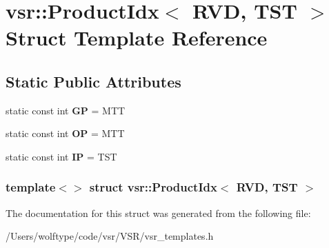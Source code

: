 \hypertarget{structvsr_1_1_product_idx_3_01_r_v_d_00_01_t_s_t_01_4}{\section{vsr\-:\-:Product\-Idx$<$ R\-V\-D, T\-S\-T $>$ Struct Template Reference}
\label{structvsr_1_1_product_idx_3_01_r_v_d_00_01_t_s_t_01_4}
}
\subsection*{Static Public Attributes}
\begin{DoxyCompactItemize}
\item 
\hypertarget{structvsr_1_1_product_idx_3_01_r_v_d_00_01_t_s_t_01_4_a3efa4a178ffda41733f9edd41c249d44}{static const int {\bfseries G\-P} = M\-T\-T}\label{structvsr_1_1_product_idx_3_01_r_v_d_00_01_t_s_t_01_4_a3efa4a178ffda41733f9edd41c249d44}

\item 
\hypertarget{structvsr_1_1_product_idx_3_01_r_v_d_00_01_t_s_t_01_4_a1bb440a06fc5cb09403a5edca88b5750}{static const int {\bfseries O\-P} = M\-T\-T}\label{structvsr_1_1_product_idx_3_01_r_v_d_00_01_t_s_t_01_4_a1bb440a06fc5cb09403a5edca88b5750}

\item 
\hypertarget{structvsr_1_1_product_idx_3_01_r_v_d_00_01_t_s_t_01_4_a86c11e87f8719978322c1649f862dc43}{static const int {\bfseries I\-P} = T\-S\-T}\label{structvsr_1_1_product_idx_3_01_r_v_d_00_01_t_s_t_01_4_a86c11e87f8719978322c1649f862dc43}

\end{DoxyCompactItemize}
\subsubsection*{template$<$$>$ struct vsr\-::\-Product\-Idx$<$ R\-V\-D, T\-S\-T $>$}



The documentation for this struct was generated from the following file\-:\begin{DoxyCompactItemize}
\item 
/\-Users/wolftype/code/vsr/\-V\-S\-R/vsr\-\_\-templates.\-h\end{DoxyCompactItemize}
